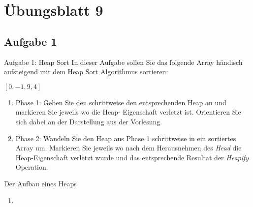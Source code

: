 \section{Übungsblatt 9}
\subsection{Aufgabe 1}
{\taskenum
\begin{frame}[c]{Aufgabe 1: Heap Sort}
    In dieser Aufgabe sollen Sie das folgende Array händisch aufsteigend mit dem Heap Sort Algorithmus sortieren: \begin{center}
    \([0, -1, 9, 4]\)
\end{center}
\begin{enumerate}
    \item Phase 1: Geben Sie den schrittweise den entsprechenden Heap an und markieren Sie jeweils wo die Heap-
    Eigenschaft verletzt ist. Orientieren Sie sich dabei an der Darstellung aus der Vorlesung.
    \item Phase 2: Wandeln Sie den Heap aus Phase 1 schrittweise in ein sortiertes Array um. Markieren Sie jeweils wo nach dem Herausnehmen des \textit{Head} die Heap-Eigenschaft verletzt wurde und das entsprechende Resultat der \textit{Heapify} Operation.
\end{enumerate}
\endtaskblock
\end{frame}
{
\begin{frame}{Der Aufbau eines Heaps}
    \begin{enumerate}
        \item<2-> 
    \end{enumerate}\vfill
{}
\centering\downsize{}
\end{frame}}}
